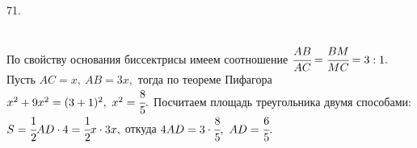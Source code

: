 71. \begin{figure}[ht!]
\end{figure}\\
По свойству основания биссектрисы имеем соотношение $\cfrac{AB}{AC}=\cfrac{BM}{MC}=3:1.$ Пусть $AC=x,\ AB=3x,$ тогда по теореме Пифагора $x^2+9x^2=(3+1)^2,\ x^2=\cfrac{8}{5}.$ Посчитаем площадь треугольника двумя способами: $S=\cfrac{1}{2}AD\cdot4=\cfrac{1}{2}x\cdot3x,$ откуда $4AD=3\cdot\cfrac{8}{5},\ AD=\cfrac{6}{5}.$\\
